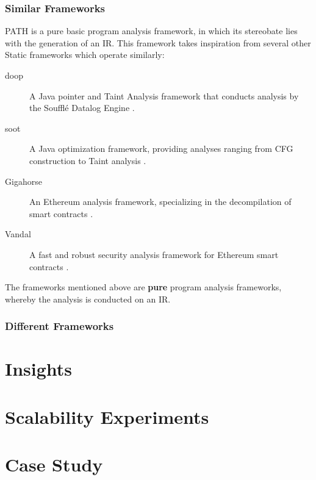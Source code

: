             \subsubsection*{Similar Frameworks}
            \par \acs{PATH} is a pure basic program analysis framework, in which its stereobate lies with the generation of an \acs{IR}. This framework takes inspiration from several other
            Static frameworks which operate similarly:
            \begin{description}
                \item[doop]A Java pointer and Taint Analysis framework that conducts analysis by the Soufflé Datalog Engine \cite[]{bravenboer2009strictly}.
                \item[soot]A Java optimization framework, providing analyses ranging from \acs{CFG} construction to Taint analysis \cite[]{vallee2010soot}.
                \item[Gigahorse]An Ethereum analysis framework, specializing in the decompilation of smart contracts \cite[]{grech2019gigahorse}.
                \item[Vandal]A fast and robust security analysis framework for Ethereum smart contracts \cite[]{brent2018vandal}.
            \end{description}
            \par The frameworks mentioned above are {\bfseries pure} program analysis frameworks, whereby the analysis is conducted on an \acs{IR}. 
            
            \subsubsection*{Different Frameworks}


    \section{Insights}
    \label{sec:ins}
    \par 
    \section{Scalability Experiments}
    \label{sec:scalex}
    \section{Case Study}